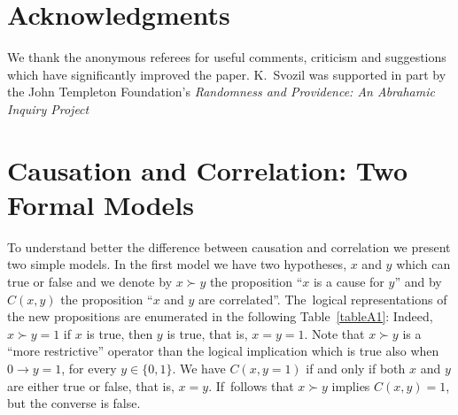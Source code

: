 \documentclass[12pt]{article}
\begin{document}
\section{Acknowledgments}
We thank the anonymous referees for useful comments, criticism and suggestions which have significantly improved the paper.
K.~Svozil was supported in part by the
John Templeton Foundation's {\em Randomness and Providence: An Abrahamic Inquiry Project}

\appendix
\section{Causation and Correlation: Two Formal Models}\label{appA}
\unskip
%

To understand better the difference between causation and correlation we present two simple models. In the first model we have two hypotheses,
$x$ and $y$ which can true or false and we denote by $x \succ y$ the proposition
``$x$ is a cause for $y$'' and by $C(x,y)$ the proposition ``$x$ and $y$ are correlated''.
The~logical representations of the new propositions are enumerated in the following Table~\ref{tableA1}: %
Indeed, $x \succ y = 1$ if  $x$ is true, then $y$ is true, that is, $x=y=1$. Note that $x \succ y$ is a ``more restrictive''  operator  than the logical implication which
is true also when $0 \rightarrow  y=1$, for every $y\in\{0,1\}$. We have $C(x,y=1)$
if and only  if both $x$ and $y$ are either true or false, that is, $x=y$. If~follows that  $x \succ y$ implies $C(x,y)=1$, but the converse is false.
\end{document}
